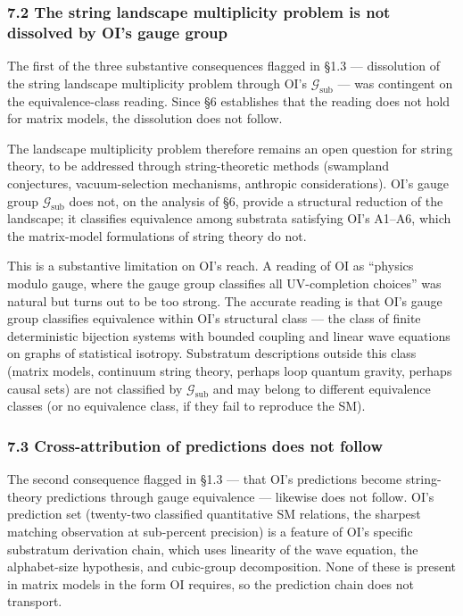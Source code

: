 \documentclass[
]{article}
\begin{document}
\hypertarget{the-string-landscape-multiplicity-problem-is-not-dissolved-by-ois-gauge-group}{%
\subsubsection{7.2 The string landscape multiplicity problem is not
dissolved by OI's gauge
group}\label{the-string-landscape-multiplicity-problem-is-not-dissolved-by-ois-gauge-group}}

The first of the three substantive consequences flagged in §1.3 ---
dissolution of the string landscape multiplicity problem through OI's
\(\mathcal{G}_{\text{sub}}\) --- was contingent on the equivalence-class
reading. Since §6 establishes that the reading does not hold for matrix
models, the dissolution does not follow.

The landscape multiplicity problem therefore remains an open question
for string theory, to be addressed through string-theoretic methods
(swampland conjectures, vacuum-selection mechanisms, anthropic
considerations). OI's gauge group \(\mathcal{G}_{\text{sub}}\) does not,
on the analysis of §6, provide a structural reduction of the landscape;
it classifies equivalence among substrata satisfying OI's A1--A6, which
the matrix-model formulations of string theory do not.

This is a substantive limitation on OI's reach. A reading of OI as
``physics modulo gauge, where the gauge group classifies all
UV-completion choices'' was natural but turns out to be too strong. The
accurate reading is that OI's gauge group classifies equivalence within
OI's structural class --- the class of finite deterministic bijection
systems with bounded coupling and linear wave equations on graphs of
statistical isotropy. Substratum descriptions outside this class (matrix
models, continuum string theory, perhaps loop quantum gravity, perhaps
causal sets) are not classified by \(\mathcal{G}_{\text{sub}}\) and may
belong to different equivalence classes (or no equivalence class, if
they fail to reproduce the SM).

\hypertarget{cross-attribution-of-predictions-does-not-follow}{%
\subsubsection{7.3 Cross-attribution of predictions does not
follow}\label{cross-attribution-of-predictions-does-not-follow}}

The second consequence flagged in §1.3 --- that OI's predictions become
string-theory predictions through gauge equivalence --- likewise does
not follow. OI's prediction set (twenty-two classified quantitative SM
relations, the sharpest matching observation at sub-percent precision)
is a feature of OI's specific substratum derivation chain, which uses
linearity of the wave equation, the alphabet-size hypothesis, and
cubic-group decomposition. None of these is present in matrix models in
the form OI requires, so the prediction chain does not transport.
\end{document}
